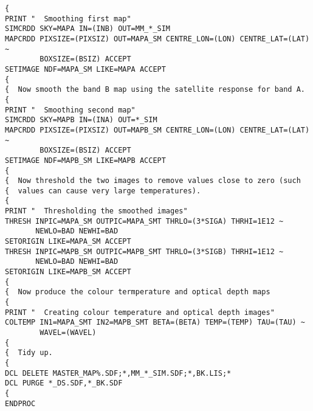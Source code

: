 \begin{verbatim}
{
PRINT "  Smoothing first map"
SIMCRDD SKY=MAPA IN=(INB) OUT=MM_*_SIM
MAPCRDD PIXSIZE=(PIXSIZ) OUT=MAPA_SM CENTRE_LON=(LON) CENTRE_LAT=(LAT) ~
        BOXSIZE=(BSIZ) ACCEPT
SETIMAGE NDF=MAPA_SM LIKE=MAPA ACCEPT
{
{  Now smooth the band B map using the satellite response for band A.
{
PRINT "  Smoothing second map"
SIMCRDD SKY=MAPB IN=(INA) OUT=*_SIM
MAPCRDD PIXSIZE=(PIXSIZ) OUT=MAPB_SM CENTRE_LON=(LON) CENTRE_LAT=(LAT) ~
        BOXSIZE=(BSIZ) ACCEPT
SETIMAGE NDF=MAPB_SM LIKE=MAPB ACCEPT
{
{  Now threshold the two images to remove values close to zero (such
{  values can cause very large temperatures).
{
PRINT "  Thresholding the smoothed images"
THRESH INPIC=MAPA_SM OUTPIC=MAPA_SMT THRLO=(3*SIGA) THRHI=1E12 ~
       NEWLO=BAD NEWHI=BAD
SETORIGIN LIKE=MAPA_SM ACCEPT
THRESH INPIC=MAPB_SM OUTPIC=MAPB_SMT THRLO=(3*SIGB) THRHI=1E12 ~
       NEWLO=BAD NEWHI=BAD
SETORIGIN LIKE=MAPB_SM ACCEPT
{
{  Now produce the colour termperature and optical depth maps
{
PRINT "  Creating colour temperature and optical depth images"
COLTEMP IN1=MAPA_SMT IN2=MAPB_SMT BETA=(BETA) TEMP=(TEMP) TAU=(TAU) ~
        WAVEL=(WAVEL)
{
{  Tidy up.
{
DCL DELETE MASTER_MAP%.SDF;*,MM_*_SIM.SDF;*,BK.LIS;*
DCL PURGE *_DS.SDF,*_BK.SDF
{
ENDPROC
\end{verbatim}
\normalsize



